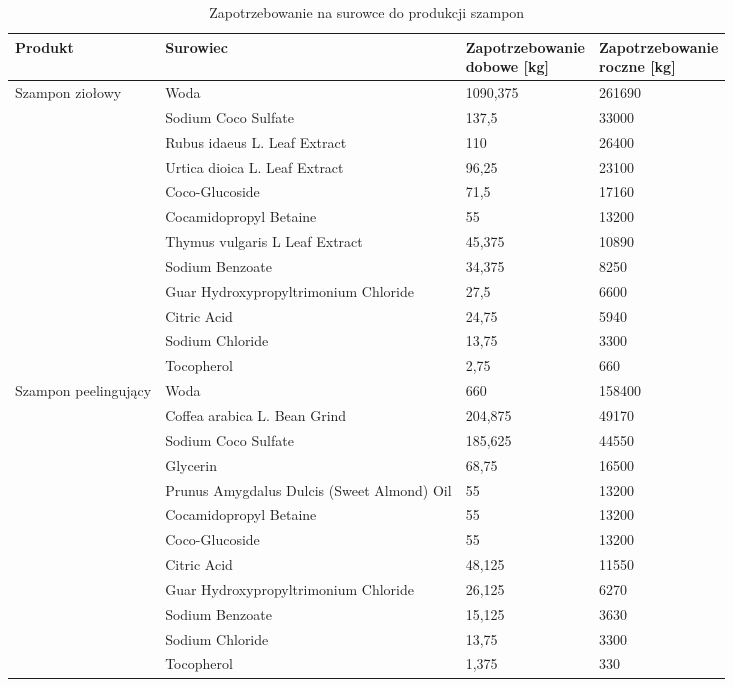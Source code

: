 \begin{table}[h]
	\centering
	\caption{Zapotrzebowanie na surowce do produkcji szampon}
	\begin{tabular}{llll}
		\hline
		\textbf{Produkt} & \textbf{Surowiec} & \makecell[l]{\textbf{Zapotrzebowanie} \\ \textbf{dobowe [kg]}} & \makecell[l]{\textbf{Zapotrzebowanie} \\ \textbf{roczne [kg]}} \\
		\hline\hline
		\multirow{12}{*}{Szampon ziołowy} & Woda & 1090,375 & 261690 \\
		 & Sodium Coco Sulfate & 137,5 & 33000 \\
		 & Rubus idaeus L. Leaf Extract & 110 & 26400 \\
		 & Urtica dioica L. Leaf Extract & 96,25 & 23100 \\
		 & Coco-Glucoside & 71,5 & 17160 \\
		 & Cocamidopropyl Betaine & 55 & 13200 \\
		 & Thymus vulgaris L Leaf Extract & 45,375 & 10890 \\
		 & Sodium Benzoate & 34,375 & 8250 \\
		 & Guar Hydroxypropyltrimonium Chloride & 27,5 & 6600 \\
		 & Citric Acid & 24,75 & 5940 \\
		 & Sodium Chloride & 13,75 & 3300 \\
		 & Tocopherol & 2,75 & 660 \\
		\hline
		\multirow{12}{*}{Szampon peelingujący} & Woda & 660 & 158400 \\
		 & Coffea arabica L. Bean Grind & 204,875 & 49170 \\
		 & Sodium Coco Sulfate & 185,625 & 44550 \\
		 & Glycerin & 68,75 & 16500 \\
		 & Prunus Amygdalus Dulcis (Sweet Almond) Oil & 55 & 13200 \\
		 & Cocamidopropyl Betaine & 55 & 13200 \\
		 & Coco-Glucoside & 55 & 13200 \\
		 & Citric Acid & 48,125 & 11550 \\
		 & Guar Hydroxypropyltrimonium Chloride & 26,125 & 6270 \\
		 & Sodium Benzoate & 15,125 & 3630 \\
		 & Sodium Chloride & 13,75 & 3300 \\
		 & Tocopherol & 1,375 & 330 \\
		 \hline
	\end{tabular}
\end{table}


